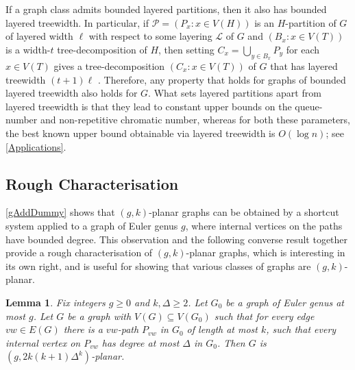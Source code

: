 \documentclass{patmorin}
\theoremstyle{plain}
\newtheorem{lem}[thm]{Lemma}
\theoremstyle{definition}
\newcommand{\PP}{\mathcal{P}}
\renewcommand{\geq}{\geqslant}
\begin{document}
If a graph class admits bounded layered partitions, then it also has bounded layered treewidth. In particular, if $\PP=(P_x:x\in V(H))$ is an $H$-partition of $G$ of layered width $\ell$ with respect to some layering $\mathcal{L}$ of $G$ and $(B_x:x\in V(T))$ is a width-$t$ tree-decomposition of $H$, then setting $C_x = \bigcup_{y\in B_x} P_y$ for each $x\in V(T)$ gives a tree-decomposition $(C_x:x\in V(T))$ of $G$ that has layered treewidth $(t+1)\ell$ \cite{DJMMUW20}. Therefore, any property that holds for graphs of bounded layered treewidth also holds for $G$. What sets layered partitions apart from layered treewidth is that they lead to constant upper bounds on the queue-number  and non-repetitive chromatic number, whereas for both these parameters, the best known upper bound obtainable via layered treewidth is $O(\log n)$; see \cref{Applications}.


\subsection{Rough Characterisation}
\label{Characterisation}

\cref{gAddDummy} shows that $(g,k)$-planar graphs can be obtained by a shortcut system applied to a graph of Euler genus $g$, where internal vertices on the paths have bounded degree. This observation and the following converse result together provide a rough characterisation of $(g,k)$-planar graphs, which is interesting in its own right, and is useful for showing that various classes of graphs are $(g,k)$-planar.

\begin{lem}
	\label{DrawG}
	Fix integers $g\geq 0$ and $k,\Delta\geq 2$.
	Let $G_0$ be a graph of Euler genus at most $g$. Let $G$ be
	a graph with $V(G) \subseteq V(G_0)$ such that for every edge $vw \in
	E(G)$ there is a $vw$-path $P_{vw}$ in $G_0$ of length at most $k$, such
	that every internal vertex on $P_{vw}$ has degree at most $\Delta$ in
	$G_0$. Then $G$ is $(g, 2k(k+1)\Delta^{k} )$-planar.
\end{lem}
\end{document}

